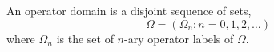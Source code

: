 An operator domain is a disjoint sequence of sets,
$$\Omega = (\Omega_n : n = 0, 1, 2, \ldots)$$
where $\Omega_n$ is the set of $n$-ary operator labels of $\Omega$.
